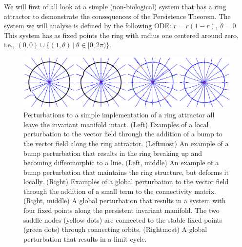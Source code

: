 \documentclass{article}
\newcounter{ct}
\theoremstyle{definition}
\theoremstyle{remark}
\begin{document}




We will first of all look at a simple (non-biological) system that has a ring attractor to demonstrate the consequences of the Persistence Theorem.
The system we will analyse is defined by the following ODE: $\dot r = r(1-r), \ \dot \theta = 0.$
This system has as fixed points the ring with radius one centered around zero, i.e., $(0,0)\cup\{(1,\theta)\ |\ \theta\in[0,2\pi)\}$.




\begin{figure}[H]
     \centering
  \includegraphics[width=\textwidth]{figures/ring_perturbations_stream}
       \caption{Perturbations to a simple implementation of a ring attractor all leave the invariant manifold intact. (Left)  Examples of a local perturbation to the vector field through the addition of a bump to the vector field along the ring attractor.
              (Leftmost) An example of a bump perturbation that results in the ring breaking up and becoming diffeomorphic to a line. %
              (Left, middle) An example of a bump perturbation that maintains the ring structure, but deforms it locally.
       (Right) Examples of a global perturbation to the vector field through the addition of a small term to the connectivity matrix. 
       (Right, middle) A global perturbation that results in a system with four fixed points along the persistent invariant manifold. The two saddle nodes (yellow dots) are connected to the stable fixed points (green dots) through connecting orbits.
       (Rightmost)   A global perturbation that results in a limit cycle.}
         \label{fig:ring_activity_pert}
\end{figure}
\end{document}
